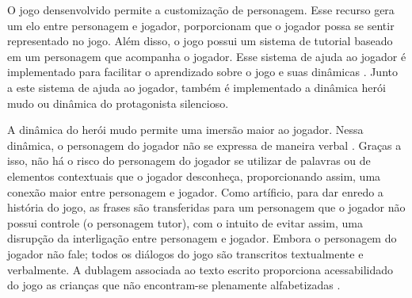 \vspace{-0.1cm}

O jogo densenvolvido permite a customização de personagem. Esse recurso gera um elo entre personagem e jogador, porporcionam que o jogador possa se sentir representado no jogo. Além disso, o jogo possui um sistema de tutorial baseado em um personagem que acompanha o jogador. Esse sistema de ajuda ao jogador é implementado para facilitar o aprendizado sobre o jogo e suas dinâmicas \cite{buchinger2014sherlock}. Junto a este sistema de ajuda ao jogador, também é implementado a dinâmica herói mudo ou dinâmica do protagonista silencioso. 

\vspace{-0.1cm}

A dinâmica do herói mudo permite uma imersão maior ao jogador. Nessa dinâmica, o personagem do jogador não se expressa de maneira verbal \cite{domsch2017dialogue}. Graças a isso, não há o risco do personagem do jogador se utilizar de palavras ou de elementos contextuais que o jogador desconheça, proporcionando assim, uma conexão maior entre personagem e jogador. Como artíficio, para dar enredo a história do jogo, as frases são transferidas para um personagem que o jogador não possui controle (o personagem tutor), com o intuito de evitar assim, uma disrupção da interligação entre personagem e jogador. Embora o personagem do jogador não fale; todos os diálogos do jogo são transcritos textualmente e verbalmente. A dublagem associada ao texto escrito proporciona acessabilidado do jogo as crianças que não encontram-se plenamente alfabetizadas \cite{limeira2015avaliaccao}. 

\vspace{-0.1cm}


